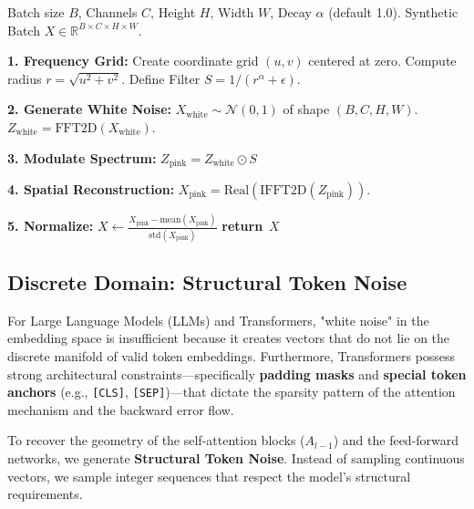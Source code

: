 \documentclass{article}
\theoremstyle{plain}
\theoremstyle{definition}
\theoremstyle{remark}
\newcommand{\RETURN}{\STATE \textbf{return}~}
\begin{document}
\begin{algorithm}[h]
\caption{Synthetic Pink Noise Generator ($1/f^\alpha$)}
\label{alg:pink_noise}
\begin{algorithmic}[1]
\REQUIRE Batch size $B$, Channels $C$, Height $H$, Width $W$, Decay $\alpha$ (default 1.0).
\ENSURE Synthetic Batch $X \in \mathbb{R}^{B \times C \times H \times W}$.

\STATE \textbf{1. Frequency Grid:}
\STATE Create coordinate grid $(u, v)$ centered at zero.
\STATE Compute radius $r = \sqrt{u^2 + v^2}$.
\STATE Define Filter $S = 1 / (r^{\alpha} + \epsilon)$.

\STATE \textbf{2. Generate White Noise:}
\STATE $X_{\text{white}} \sim \mathcal{N}(0, 1)$ of shape $(B, C, H, W)$.
\STATE $Z_{\text{white}} = \text{FFT2D}(X_{\text{white}})$.

\STATE \textbf{3. Modulate Spectrum:}
\STATE $Z_{\text{pink}} = Z_{\text{white}} \odot S$ 

\STATE \textbf{4. Spatial Reconstruction:}
\STATE $X_{\text{pink}} = \text{Real}(\text{IFFT2D}(Z_{\text{pink}}))$.

\STATE \textbf{5. Normalize:}
\STATE $X \leftarrow \frac{X_{\text{pink}} - \text{mean}(X_{\text{pink}})}{\text{std}(X_{\text{pink}})}$ 
\STATE \RETURN $X$
\end{algorithmic}
\end{algorithm}

\subsection{Discrete Domain: Structural Token Noise}
\label{app:token_noise}

For Large Language Models (LLMs) and Transformers, "white noise" in the embedding space is insufficient because it creates vectors that do not lie on the discrete manifold of valid token embeddings. Furthermore, Transformers possess strong architectural constraints—specifically \textbf{padding masks} and \textbf{special token anchors} (e.g., \texttt{[CLS]}, \texttt{[SEP]})—that dictate the sparsity pattern of the attention mechanism and the backward error flow.

To recover the geometry of the self-attention blocks ($A_{l-1}$) and the feed-forward networks, we generate \textbf{Structural Token Noise}. Instead of sampling continuous vectors, we sample integer sequences that respect the model's structural requirements.
\end{document}

